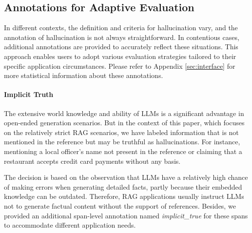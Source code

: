 \documentclass[11pt]{article}
\begin{document}
\subsection{Annotations for Adaptive Evaluation}
In different contexts, the definition and criteria for hallucination vary, and the annotation of hallucination is not always straightforward. In contentious cases, additional annotations are provided to accurately reflect these situations. This approach enables users to adopt various evaluation strategies tailored to their specific application circumstances. Please refer to Appendix \ref{sec:interface} for more statistical information about these annotations.


\paragraph{Implicit Truth} The extensive world knowledge and ability of LLMs is a significant advantage in open-ended generation scenarios. But in the context of this paper, which focuses on the relatively strict RAG scenarios, we have labeled information that is not mentioned in the reference but may be truthful as hallucinations. 
For instance, mentioning a local officer's name not present in the reference or claiming that a restaurant accepts credit card payments without any basis.

The decision is based on the observation that LLMs have a relatively high chance of making errors when generating detailed facts, partly because their embedded knowledge can be outdated. Therefore, RAG applications usually instruct LLMs not to generate factual content without the support of references.
Besides, we provided an additional span-level annotation named \textit{implicit\_true} for these spans to accommodate different application needs. 
\end{document}

